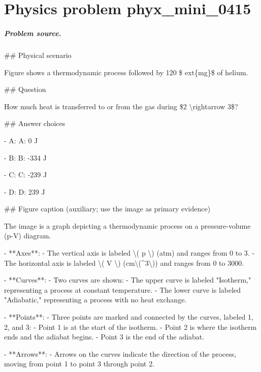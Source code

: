 
\chapter{Physics problem phyx\_mini\_0415}
\label{ch:PhyXMiniProblems_problem_phyx_mini_0415}

\paragraph{Problem source.}
\#\# Physical scenario

Figure shows a thermodynamic process followed by 120 \$	ext\{mg\}\$ of helium.

\#\# Question

How much heat is transferred to or from the gas during \$2 \textbackslash{}rightarrow 3\$?

\#\# Answer choices

- A: A: 0 J

- B: B: -334 J

- C: C: -239 J

- D: D: 239 J

\#\# Figure caption (auxiliary; use the image as primary evidence)

The image is a graph depicting a thermodynamic process on a pressure-volume (p-V) diagram.

- **Axes**: 
  - The vertical axis is labeled \textbackslash{}( p \textbackslash{}) (atm) and ranges from 0 to 3.
  - The horizontal axis is labeled \textbackslash{}( V \textbackslash{}) (cm\textbackslash{}(\textasciicircum{}3\textbackslash{})) and ranges from 0 to 3000.

- **Curves**:
  - Two curves are shown:
    - The upper curve is labeled "Isotherm," representing a process at constant temperature.
    - The lower curve is labeled "Adiabatic," representing a process with no heat exchange.

- **Points**:
  - Three points are marked and connected by the curves, labeled 1, 2, and 3:
    - Point 1 is at the start of the isotherm.
    - Point 2 is where the isotherm ends and the adiabat begins.
    - Point 3 is the end of the adiabat.

- **Arrows**:
  - Arrows on the curves indicate the direction of the process, moving from point 1 to point 3 through point 2.


